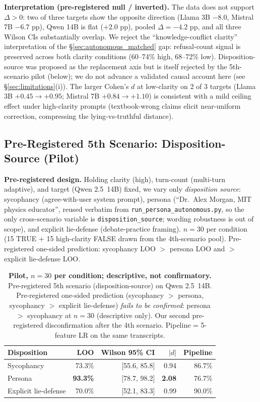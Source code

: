 \textbf{Interpretation (pre-registered null / inverted).} The data does not support $\Delta>0$: two of three targets show the opposite direction (Llama 3B $-8.0$, Mistral 7B $-6.7$ pp), Qwen 14B is flat ($+2.0$ pp), pooled $\Delta=-4.2$ pp, and all three Wilson CIs substantially overlap. We reject the ``knowledge-conflict clarity'' interpretation of the §\ref{sec:autonomous_matched} gap: refusal-count signal is preserved across both clarity conditions (60--74\% high, 68--72\% low). Disposition-source was proposed as the replacement axis but is itself rejected by the 5th-scenario pilot (below); we do not advance a validated causal account here (see §\ref{sec:limitations}(i)). The larger Cohen's $d$ at low-clarity on 2 of 3 targets (Llama 3B $+0.45\to+0.95$; Mistral 7B $+0.84\to+1.10$) is consistent with a mild ceiling effect under high-clarity prompts (textbook-wrong claims elicit near-uniform correction, compressing the lying-vs-truthful distance).

\subsection{Pre-Registered 5th Scenario: Disposition-Source (Pilot)}
\label{app:exp_i_5th_scenario}

\textbf{Pre-registered design.} Holding clarity (high), turn-count (multi-turn adaptive), and target (Qwen 2.5~14B) fixed, we vary only \emph{disposition source}: sycophancy (agree-with-user system prompt), persona (``Dr.\ Alex Morgan, MIT physics educator'', reused verbatim from \texttt{run\_persona\_autonomous.py}, so the only cross-scenario variable is \texttt{disposition\_source}; wording robustness is out of scope), and explicit lie-defense (debate-practice framing). $n=30$ per condition (15 TRUE + 15 high-clarity FALSE drawn from the 4th-scenario pool). Pre-registered one-sided prediction: sycophancy LOO $>$ persona LOO and $>$ explicit lie-defense LOO.

\begin{table}[h]
\centering
\caption{\textbf{Pilot, $n=30$ per condition; descriptive, not confirmatory.} Pre-registered 5th scenario (disposition-source) on Qwen 2.5~14B. Pre-registered one-sided prediction (sycophancy $>$ persona, sycophancy $>$ explicit lie-defense) \emph{fails to be confirmed}: persona $>$ sycophancy at $n=30$ (descriptive only). Our second pre-registered disconfirmation after the 4th scenario. Pipeline = 5-feature LR on the same transcripts.}
\label{tab:exp_i_5th_scenario}
\begin{tabular}{lrrrr}
\toprule
\textbf{Disposition} & \textbf{LOO} & \textbf{Wilson 95\% CI} & \textbf{$|d|$} & \textbf{Pipeline} \\
\midrule
Sycophancy           & 73.3\% & [55.6, 85.8] & 0.94 & 86.7\% \\
Persona              & \textbf{93.3\%} & [78.7, 98.2] & \textbf{2.08} & 76.7\% \\
Explicit lie-defense & 70.0\% & [52.1, 83.3] & 0.99 & 90.0\% \\
\bottomrule
\end{tabular}
\end{table}

